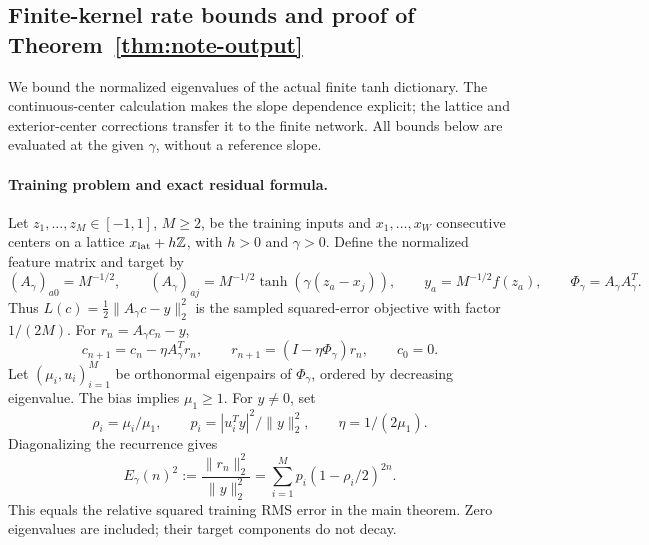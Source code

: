 \subsection{Finite-kernel rate bounds and proof of Theorem~\ref{thm:note-output}}
\label{app:note-spectrum}

We bound the normalized eigenvalues of the actual finite tanh dictionary.
The continuous-center calculation makes the slope dependence explicit;
the lattice and exterior-center corrections transfer it to the finite network.
All bounds below are evaluated at the given $\gamma$, without a reference slope.

\paragraph{Training problem and exact residual formula.}
Let $z_1,\ldots,z_M\in[-1,1]$, $M\ge2$, be the training inputs and
$x_1,\ldots,x_W$ consecutive centers on a lattice $x_{\rm lat}+h\mathbb Z$,
with $h>0$ and $\gamma>0$. Define the normalized feature matrix and target by
\begin{equation}
 (A_\gamma)_{a0}=M^{-1/2},\qquad
 (A_\gamma)_{aj}=M^{-1/2}\tanh(\gamma(z_a-x_j)),\qquad
 y_a=M^{-1/2}f(z_a),\qquad \Phi_\gamma=A_\gamma A_\gamma^T.
 \label{eq:note-feature-definition}
\end{equation}
Thus $L(c)=\tfrac12\|A_\gamma c-y\|_2^2$ is the sampled squared-error
objective with factor $1/(2M)$. For $r_n=A_\gamma c_n-y$,
\begin{equation}
 c_{n+1}=c_n-\eta A_\gamma^Tr_n,
 \qquad r_{n+1}=(I-\eta\Phi_\gamma)r_n,
 \qquad c_0=0.
 \label{eq:note-residual-recurrence}
\end{equation}
Let $(\mu_i,u_i)_{i=1}^M$ be orthonormal eigenpairs of $\Phi_\gamma$,
ordered by decreasing eigenvalue. The bias implies $\mu_1\ge1$.
For $y\ne0$, set
\begin{equation}
 \rho_i=\mu_i/\mu_1,\qquad
 p_i=|u_i^Ty|^2/\|y\|_2^2,\qquad \eta=1/(2\mu_1).
 \label{eq:note-target-weights}
\end{equation}
Diagonalizing the recurrence gives
\begin{equation}
 E_\gamma(n)^2:=\frac{\|r_n\|_2^2}{\|y\|_2^2}
 =\sum_{i=1}^M p_i(1-\rho_i/2)^{2n}.
 \label{eq:note-exact-spectral-error}
\end{equation}
This equals the relative squared training RMS error in the main theorem.
Zero eigenvalues are included; their target components do not decay.

